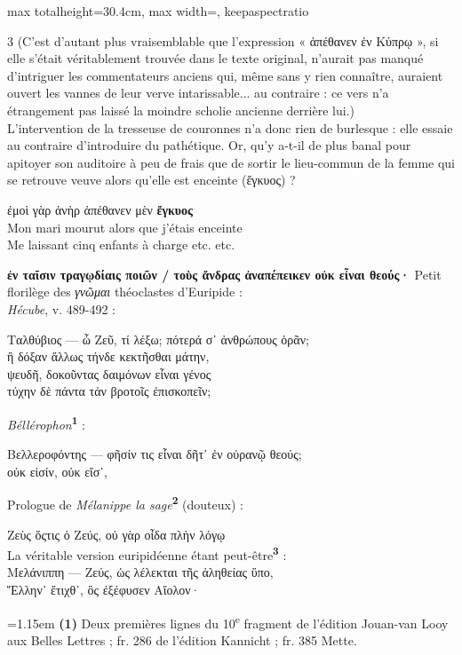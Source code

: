 \documentclass[11pt,twoside]{book}
\newcommand{\italique}[1]{\textit{#1}}
\newcommand{\citComm}[1]{\begin{quoting}[vskip=0.4pt,leftmargin=0.7em,rightmargin=0.2em]#1\end{quoting}}
\newcommand{\nieme}[1]{#1\textsuperscript{e}}
\newcommand{\grec}[1]{{\policeGr #1}}
\newcommand{\marqueur}[1]{\textsuperscript{\color{rubricRed}\textbf{#1}}}
\begin{document}
\begin{adjustbox}{max totalheight=30.4cm, max width=\textwidth, keepaspectratio}
\begin{minipage}{\textwidth}
{\begin{multicols}{3}
\noindent (C'est d'autant plus vraisemblable que l'expression « ἀπέθανεν ἐν Κύπρῳ », si elle s'était véritablement trouvée dans le texte original, n'aurait pas manqué d'intriguer les commentateurs anciens qui, même sans y rien connaître, auraient ouvert les vannes de leur verve intarissable... au contraire : ce vers n'a étrangement pas laissé la moindre scholie ancienne derrière lui.)\\ L'intervention de la tresseuse de couronnes n'a donc rien de burlesque : elle essaie au contraire d'introduire du pathétique. Or, qu'y a-t-il de plus banal pour apitoyer son auditoire à peu de frais que de sortir le lieu-commun de la femme qui se retrouve veuve alors qu'elle est enceinte (ἔγκυος) ?
\citComm{ἐμοὶ γὰρ ἁνὴρ ἀπέθανεν μὲν \textbf{ἔγκυος}\\
Mon mari mourut alors que j'étais enceinte \\
Me laissant cinq enfants à charge etc. etc.}
\par\vspace{1.5pt}
 \textbf{ἐν ταῖσιν τραγῳδίαις ποιῶν / τοὺς ἄνδρας ἀναπέπεικεν οὐκ εἶναι θεούς·} Petit florilège des \italique{\grec{γνῶμαι}} théoclastes d'Euripide :\\ \italique{Hécube}, v. 489-492 :
\citComm{Ταλθύβιος — ὦ Ζεῦ, τί λέξω; πότερά σ᾽ ἀνθρώπους ὁρᾶν;\\
ἢ δόξαν ἄλλως τήνδε κεκτῆσθαι μάτην,\\
ψευδῆ, δοκοῦντας δαιμόνων εἶναι γένος\\
τύχην δὲ πάντα τἀν βροτοῖς ἐπισκοπεῖν;}
\par\vspace{1.5pt}
\noindent \italique{Béllérophon}\marqueur{1} :
\citComm{Βελλεροφόντης — φῆσίν τις εἶναι δῆτ᾽ ἐν οὐρανῷ θεούς;\\
οὐκ εἰσίν, οὐκ εἴσ᾽,}
\par\vspace{1.5pt}
\noindent Prologue de \italique{Mélanippe la sage}\marqueur{2} (douteux) :
\citComm{Ζεὺς ὅςτις ὁ Ζεύς, οὐ γὰρ οἶδα πλὴν λόγῳ\\
La véritable version euripidéenne étant peut-être\marqueur{3} :\\
Μελάνιππη — Ζεύς, ὡς λέλεκται τῆς ἀληθείας ὕπο,\\
Ἕλλην᾽ ἔτιχθ᾽, ὃς ἐξέφυσεν Αἴολον·}
\par\vspace{1.5pt}
\par\vspace{1.2pt}\par\nopagebreak\vspace{1pt}\noindent\hangindent=1.15em {\color{sepiaNote}\textbf{(1)}} Deux premières lignes du \nieme{10} fragment de l'édition Jouan-van Looy aux Belles Lettres ; fr. 286 de l'édition Kannicht ; fr. 385 Mette.

\end{multicols}}
\end{minipage}
\end{adjustbox}
\end{document}
